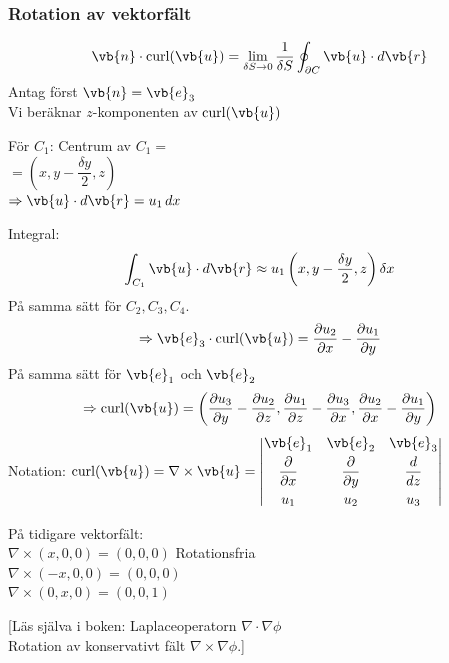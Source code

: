 \subsubsection*{Rotation av vektorfält}

\begin{minipage}{0.25\linewidth}
\end{minipage}
\begin{minipage}{0.73\linewidth}
\[ \vb{n} \cdot \operatorname{curl}(\vb{u}) = \lim_{\delta S \to 0} \frac{1}{\delta S} \oint_{\partial C} \vb{u} \cdot d\vb{r} \]
Antag först $\vb{n} = \vb{e}_3$\\
Vi beräknar $z$-komponenten av $\operatorname{curl}(\vb{u})$
\end{minipage}

\begin{minipage}{0.42\linewidth}
\end{minipage}
\begin{minipage}{0.56\linewidth}
För $C_1$: Centrum av $C_1 =$\\
$= \left( x, y - \dfrac{\delta y}{2}, z \right)$\\
$\Rightarrow \vb{u} \cdot d\vb{r} = u_1\,dx$
\end{minipage}

Integral:
\[ \int_{C_1} \vb{u} \cdot d\vb{r} \approx u_1\left( x, y - \frac{\delta y}{2}, z \right) \delta x \]
På samma sätt för $C_2, C_3, C_4$.
\[ \Rightarrow \vb{e}_3 \cdot \operatorname{curl}(\vb{u}) = \frac{\partial u_2}{\partial x} - \frac{\partial u_1}{\partial y} \]
På samma sätt för $\vb{e}_1$ och $\vb{e}_2$
\[ \Rightarrow \operatorname{curl}(\vb{u}) = \left( \frac{\partial u_3}{\partial y} - \frac{\partial u_2}{\partial z}, \frac{\partial u_1}{\partial z} - \frac{\partial u_3}{\partial x}, \frac{\partial u_2}{\partial x} - \frac{\partial u_1}{\partial y} \right) \]
Notation: $\operatorname{curl}(\vb{u}) = \nabla \times \vb{u} = \begin{vmatrix} \vb{e}_1 & \vb{e}_2 & \vb{e}_3 \\[0.3em] \dfrac{\partial}{\partial x} & \dfrac{\partial}{\partial y} & \dfrac{d}{dz} \\[0.8em] u_1 & u_2 & u_3 \end{vmatrix}$

På tidigare vektorfält:\\
$\nabla \times (x, 0, 0) = (0, 0, 0)$ \quad Rotationsfria\\
$\nabla \times (-x, 0, 0) = (0, 0, 0)$\\
$\nabla \times (0, x, 0) = (0, 0, 1)$

[Läs själva i boken: Laplaceoperatorn $\nabla \cdot \nabla\phi$\\
Rotation av konservativt fält $\nabla \times \nabla\phi$.]
